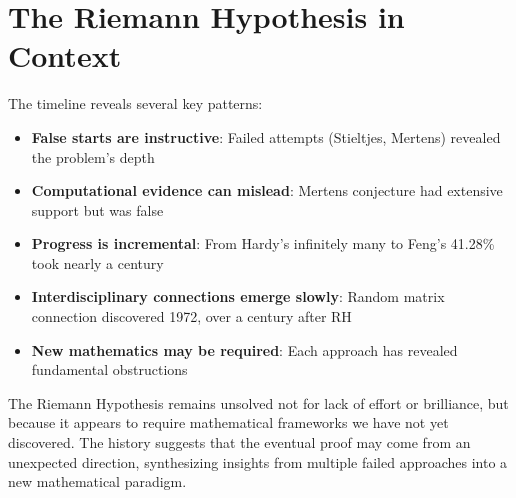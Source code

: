 \section*{The Riemann Hypothesis in Context}

The timeline reveals several key patterns:

\begin{itemize}
\item \textbf{False starts are instructive}: Failed attempts (Stieltjes, Mertens) revealed the problem's depth
\item \textbf{Computational evidence can mislead}: Mertens conjecture had extensive support but was false
\item \textbf{Progress is incremental}: From Hardy's infinitely many to Feng's 41.28\% took nearly a century
\item \textbf{Interdisciplinary connections emerge slowly}: Random matrix connection discovered 1972, over a century after RH
\item \textbf{New mathematics may be required}: Each approach has revealed fundamental obstructions
\end{itemize}

The Riemann Hypothesis remains unsolved not for lack of effort or brilliance, but because it appears to require mathematical frameworks we have not yet discovered. The history suggests that the eventual proof may come from an unexpected direction, synthesizing insights from multiple failed approaches into a new mathematical paradigm.